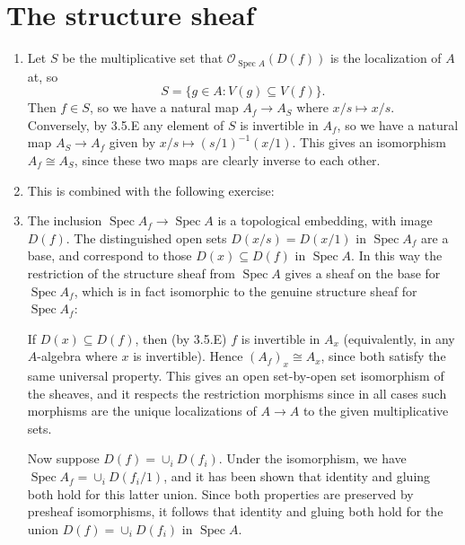 \documentclass{report}
\renewcommand{\O}{\mathscr{O}} %
\DeclareMathOperator{\Spec}{Spec}
\begin{document}
\chapter{The structure sheaf}

\begin{enumerate}[label=\textbf{4.1.\Alph*.}]
	\item Let $S$ be the multiplicative set that $\O_{\Spec A}(D(f))$ is the
	      localization of $A$ at, so
	      \begin{equation*}
		      S = \{g\in A:V(g)\subseteq V(f)\}.
	      \end{equation*}
	      Then $f\in S$, so we have a natural map $A_f\to A_S$ where
	      $x/s\mapsto x/s$. Conversely, by 3.5.E any element of $S$ is invertible
	      in $A_f$, so we have a natural map $A_S\to A_f$ given by
	      $x/s\mapsto (s/1)^{-1}(x/1)$. This gives an isomorphism $A_f\cong A_S$,
	      since these two maps are clearly inverse to each other.

	\item This is combined with the following exercise:

	\item The inclusion $\Spec A_f\to\Spec A$ is a topological embedding, with
	      image $D(f)$. The distinguished open sets $D(x/s)=D(x/1)$ in $\Spec A_f$
	      are a base, and correspond to those $D(x)\subseteq D(f)$ in $\Spec A$.
	      In this way the restriction of the structure sheaf from $\Spec A$ gives
	      a sheaf on the base for $\Spec A_f$, which is in fact isomorphic to the
	      genuine structure sheaf for $\Spec A_f$:

	      If $D(x)\subseteq D(f)$, then (by 3.5.E) $f$ is invertible in $A_x$
	      (equivalently, in any $A$-algebra where $x$ is invertible). Hence
	      $(A_f)_x\cong A_x$, since both satisfy the same universal property.
	      This gives an open set-by-open set isomorphism of the sheaves, and it
	      respects the restriction morphisms since in all cases such morphisms are
	      the unique localizations of $A\to A$ to the given multiplicative sets.

	      Now suppose $D(f)=\cup_iD(f_i)$. Under the isomorphism, we have
	      $\Spec A_f=\cup_iD(f_i/1)$, and it has been shown that identity and
	      gluing both hold for this latter union. Since both properties are
	      preserved by presheaf isomorphisms, it follows that identity and gluing
	      both hold for the union $D(f)=\cup_iD(f_i)$ in $\Spec A$.


\end{enumerate}
\end{document}
